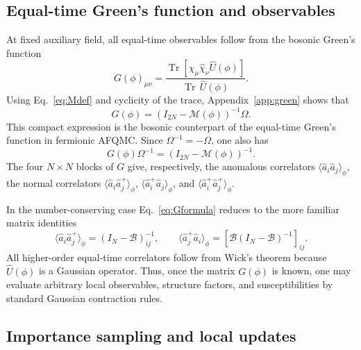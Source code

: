 \documentclass[twocolumn,aps,prb,10pt,amsmath,amssymb,amsthm,superscriptaddress]{revtex4-2}
\newcommand{\Tr}{\operatorname{Tr}}
\newcommand{\mc}[1]{\mathcal{#1}}
\theoremstyle{remark}
\begin{document}
\subsection{Equal-time Green's function and observables}

At fixed auxiliary field, all equal-time observables follow from the bosonic Green's function
\begin{equation}
    G(\phi)_{\mu\nu}
    = \frac{\Tr\left[\hat\chi_\mu\hat\chi_\nu\hat U(\phi)\right]}{\Tr\,\hat U(\phi)}.
    \label{eq:Gdef}
\end{equation}
Using Eq.~\eqref{eq:Mdef} and cyclicity of the trace, Appendix~\ref{app:green} shows that
\begin{equation}
    G(\phi) = \left(I_{2N}-\mc M(\phi)\right)^{-1}\Omega.
    \label{eq:Gformula}
\end{equation}
This compact expression is the bosonic counterpart of the equal-time Green's function in fermionic AFQMC. Since $\Omega^{-1}=-\Omega$, one also has
\begin{equation}
    G(\phi)\Omega^{-1} = \left(I_{2N}-\mc M(\phi)\right)^{-1}.
    \label{eq:Gomega_inverse}
\end{equation}
The four $N\times N$ blocks of $G$ give, respectively, the anomalous correlators $\langle \hat a_i\hat a_j\rangle_\phi$, the normal correlators $\langle \hat a_i\hat a_j^+\rangle_\phi$, $\langle \hat a_i^+\hat a_j\rangle_\phi$, and $\langle \hat a_i^+\hat a_j^+\rangle_\phi$.

In the number-conserving case Eq.~\eqref{eq:Gformula} reduces to the more familiar matrix identities
\begin{equation}
    \langle \hat a_i \hat a_j^+\rangle_\phi = \left(I_N-\mc B\right)^{-1}_{ij},
    \qquad
    \langle \hat a_j^+ \hat a_i\rangle_\phi = \left[\mc B\left(I_N-\mc B\right)^{-1}\right]_{ij}.
    \label{eq:number_green_blocks}
\end{equation}
All higher-order equal-time correlators follow from Wick's theorem because $\hat U(\phi)$ is a Gaussian operator. Thus, once the matrix $G(\phi)$ is known, one may evaluate arbitrary local observables, structure factors, and susceptibilities by standard Gaussian contraction rules.

\subsection{Importance sampling and local updates}
\end{document}
